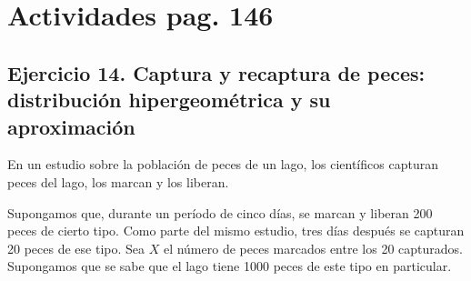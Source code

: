 \documentclass[10pt]{article}
\begin{document}
\newpage
\tableofcontents
\thispagestyle{plain}
\clearpage

\section{Actividades pag. 146}

\subsection{Ejercicio 14. Captura y recaptura de peces: distribución hipergeométrica y su aproximación}

En un estudio sobre la población de peces de un lago, los científicos capturan peces del lago, los marcan y los liberan.

Supongamos que, durante un período de cinco días, se marcan y liberan 200 peces de cierto tipo. Como parte del mismo estudio, tres días después se capturan 20 peces de ese tipo. Sea $X$ el número de peces marcados entre los 20 capturados. Supongamos que se sabe que el lago tiene 1000 peces de este tipo en particular.
\end{document}
